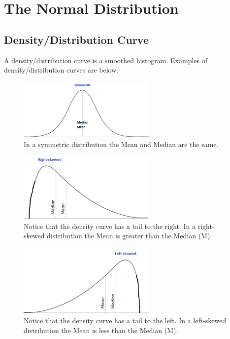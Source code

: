 \chapter{The Normal Distribution}

\section{Density/Distribution Curve }
A density/distribution curve is a smoothed histogram. Examples of density/distribution curves are below.

\begin{figure}[h!]
\centering
\includegraphics[width=0.6\textwidth]{figures/ch3.1a.jpg}
\caption{In a symmetric distribution the Mean and Median are the same.}
\label{fig:ch3.1a.jpg}
\end{figure}

\begin{figure}[h!]
\centering
\includegraphics[width=0.6\textwidth]{figures/ch3.1b.jpg}
\caption{Notice that the density curve has a tail to the right. In a right-skewed distribution the Mean is greater than the Median (M).}
\label{fig:ch3.1b.jpg}
\end{figure}

\begin{figure}[h!]
\centering
\includegraphics[width=0.6\textwidth]{figures/ch3.1c.jpg}
\caption{Notice that the density curve has a tail to the left. In a left-skewed distribution the Mean is less than the Median (M).}
\label{fig:ch3.1c.jpg}
\end{figure}

